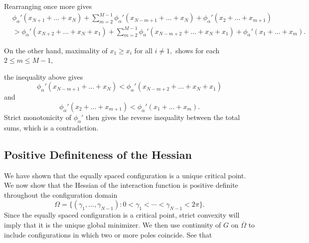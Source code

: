 \documentclass{article}
\begin{document}
Rearranging once more gives
\begin{align*}
&
\phi_\alpha'(x_{N+1}+\dots+x_N)
+
\sum_{m=2}^{M-1}
\phi_\alpha'(x_{N-m+1}+\dots+x_N)
+
\phi_\alpha'(x_2+\dots+x_{m+1})
\\
&>
\phi_\alpha'(x_{N+2}+\dots+x_N+x_1)
+
\sum_{m=2}^{M-1}
\phi_\alpha'(x_{N-m+2}+\dots+x_N+x_1)
+
\phi_\alpha'(x_1+\dots+x_m).
\end{align*}

On the other hand, maximality of $x_1\geq x_i$ for all $i\neq 1,$  shows for each $2\leq m\leq M-1,$

the inequality above gives
\[
\phi_\alpha'(x_{N-m+1}+\dots+x_N)
<
\phi_\alpha'(x_{N-m+2}+\dots+x_N+x_1)
\]
and
\[
\phi_\alpha'(x_2+\dots+x_{m+1})
<
\phi_\alpha'(x_1+\dots+x_m).
\]
 Strict monotonicity of $\phi_\alpha'$ then gives the reverse inequality between the total sums, which is a contradiction. 


\subsection{Positive Definiteness of the Hessian}
We have shown that the equally spaced configuration is a unique critical point.
We now show that the Hessian of the interaction function is positive
definite throughout the configuration domain
\[\Omega= \{(\gamma_1,\dots,\gamma_{N-1}): 0<\gamma_1<\cdots<\gamma_{N-1}<2\pi\}.
\]
Since the equally spaced configuration is a critical point, strict convexity will imply that it is the unique global minimizer. We then use continuity of $G$ on $\overline{\Omega}$ to include configurations in which two or more poles coincide.
See that 
\end{document}
